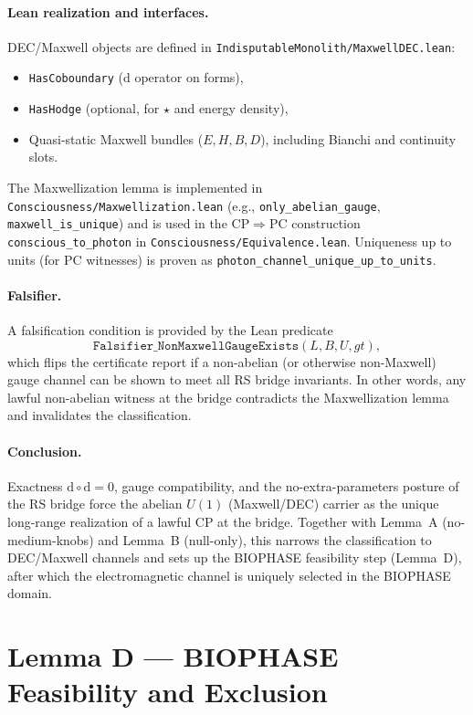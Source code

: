 \documentclass[12pt,a4paper]{article}
\begin{document}
\paragraph{Lean realization and interfaces.}
DEC/Maxwell objects are defined in \texttt{IndisputableMonolith/MaxwellDEC.lean}:
\begin{itemize}
  \item \texttt{HasCoboundary} (\(\mathrm{d}\) operator on forms),
  \item \texttt{HasHodge} (optional, for \(\star\) and energy density),
  \item Quasi-static Maxwell bundles (\(E, H, B, D\)), including Bianchi and continuity slots.
\end{itemize}
The Maxwellization lemma is implemented in \texttt{Consciousness/Maxwellization.lean} (e.g., \texttt{only\_abelian\_gauge}, \texttt{maxwell\_is\_unique}) and is used in the CP\(\Rightarrow\)PC construction \texttt{conscious\_to\_photon} in \texttt{Consciousness/Equivalence.lean}. Uniqueness up to units (for PC witnesses) is proven as \texttt{photon\_channel\_unique\_up\_to\_units}.

\paragraph{Falsifier.}
A falsification condition is provided by the Lean predicate
\[
  \texttt{Falsifier\_NonMaxwellGaugeExists}(L,B,U,gt),
\]
which flips the certificate report if a non-abelian (or otherwise non-Maxwell) gauge channel can be shown to meet all RS bridge invariants. In other words, any lawful non-abelian witness at the bridge contradicts the Maxwellization lemma and invalidates the classification.

\paragraph{Conclusion.}
Exactness \(\mathrm{d}\circ\mathrm{d}=0\), gauge compatibility, and the no-extra-parameters posture of the RS bridge force the abelian \(U(1)\) (Maxwell/DEC) carrier as the unique long-range realization of a lawful CP at the bridge. Together with Lemma~A (no-medium-knobs) and Lemma~B (null-only), this narrows the classification to DEC/Maxwell channels and sets up the BIOPHASE feasibility step (Lemma~D), after which the electromagnetic channel is uniquely selected in the BIOPHASE domain.

\section{Lemma D — BIOPHASE Feasibility and Exclusion}
\label{sec:lemmaD}
\end{document}
